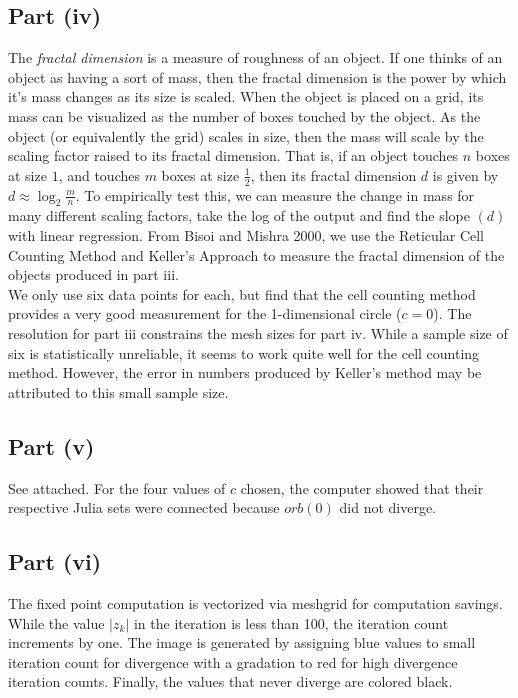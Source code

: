 \documentclass[12pt]{article}
\begin{document}
\subsection*{Part (iv)}
The \emph{fractal dimension} is a measure of roughness of an object. If one thinks of an object as having a sort of mass, then the fractal dimension is the power by which it's mass changes as its size is scaled. 
When the object is placed on a grid, its mass can be visualized as the number of boxes touched by the object. As the object (or equivalently the grid) scales in size, then the mass will scale by the scaling factor raised to its fractal dimension. 
That is, if an object touches $n$ boxes at size $1$, and touches $m$ boxes at size $\frac{1}{2}$, then its fractal dimension $d$ is given by $d\approx\log_{2}{\frac{m}{n}}$. 
To empirically test this, we can measure the change in mass for many different scaling factors, take the log of the output and find the slope $\left(d\right)$ with linear regression. From Bisoi and Mishra 2000, we use the Reticular Cell Counting Method and Keller's Approach to measure the fractal dimension of the objects produced in part iii.\\
We only use six data points for each, but find that the cell counting method provides a very good measurement for the 1-dimensional circle ($c=0$). 
The resolution for part iii constrains the mesh sizes for part iv. 
While a sample size of six is statistically unreliable, it seems to work quite well for the cell counting method. 
However, the error in numbers produced by Keller's method may be attributed to this small sample size.

\subsection*{Part (v)}
See attached.
For the four values of $c$ chosen, the computer showed that their respective Julia sets were connected because $orb(0)$ did not diverge.

\subsection*{Part (vi)}
The fixed point computation is vectorized via meshgrid for computation savings.
While the value $|z_k|$ in the iteration is less than 100, the iteration count increments by one.
The image is generated by assigning blue values to small iteration count for divergence with a gradation to red for high divergence iteration counts.
Finally, the values that never diverge are colored black.
\end{document}
